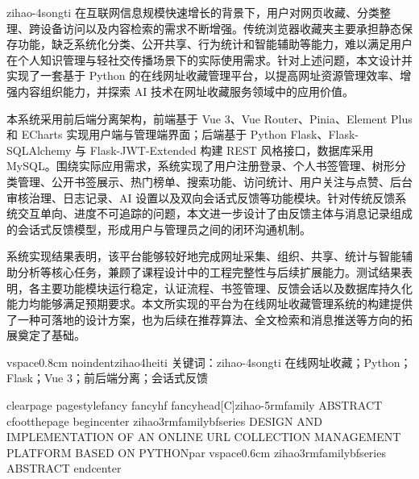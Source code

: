 {zihao{-4}songti
在互联网信息规模快速增长的背景下，用户对网页收藏、分类整理、跨设备访问以及内容检索的需求不断增强。传统浏览器收藏夹主要承担静态保存功能，缺乏系统化分类、公开共享、行为统计和智能辅助等能力，难以满足用户在个人知识管理与轻社交传播场景下的实际使用需求。针对上述问题，本文设计并实现了一套基于 Python 的在线网址收藏管理平台，以提高网址资源管理效率、增强内容组织能力，并探索 AI 技术在网址收藏服务领域中的应用价值。

本系统采用前后端分离架构，前端基于 Vue 3、Vue Router、Pinia、Element Plus 和 ECharts 实现用户端与管理端界面；后端基于 Python Flask、Flask-SQLAlchemy 与 Flask-JWT-Extended 构建 REST 风格接口，数据库采用 MySQL。围绕实际应用需求，系统实现了用户注册登录、个人书签管理、树形分类管理、公开书签展示、热门榜单、搜索功能、访问统计、用户关注与点赞、后台审核治理、日志记录、AI 设置以及双向会话式反馈等功能模块。针对传统反馈系统交互单向、进度不可追踪的问题，本文进一步设计了由反馈主体与消息记录组成的会话式反馈模型，形成用户与管理员之间的闭环沟通机制。

系统实现结果表明，该平台能够较好地完成网址采集、组织、共享、统计与智能辅助分析等核心任务，兼顾了课程设计中的工程完整性与后续扩展能力。测试结果表明，各主要功能模块运行稳定，认证流程、书签管理、反馈会话以及数据库持久化能力均能够满足预期要求。本文所实现的平台为在线网址收藏管理系统的构建提供了一种可落地的设计方案，也为后续在推荐算法、全文检索和消息推送等方向的拓展奠定了基础。

vspace{0.8cm}
noindent{zihao{4}heiti 关键词：}{zihao{-4}songti 在线网址收藏；Python；Flask；Vue 3；前后端分离；会话式反馈}
}

clearpage
pagestyle{fancy}
fancyhf{}
fancyhead[C]{zihao{-5}rmfamily ABSTRACT}
cfoot{thepage}
begin{center}
    {zihao{3}rmfamilybfseries DESIGN AND IMPLEMENTATION OF AN ONLINE URL COLLECTION MANAGEMENT PLATFORM BASED ON PYTHONpar}
    vspace{0.6cm}
    {zihao{3}rmfamilybfseries ABSTRACT}
end{center}

